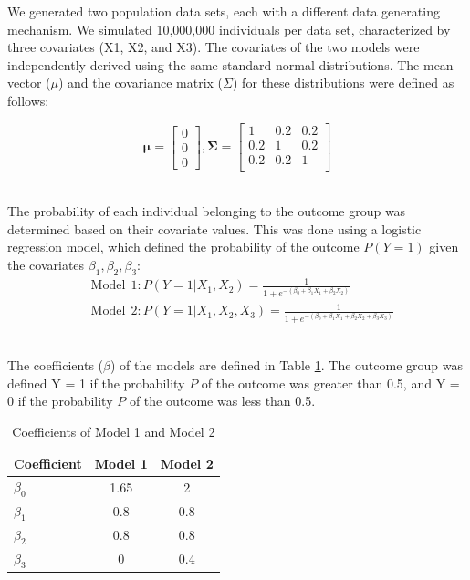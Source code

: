 \documentclass[AMA,STIX1COL]{WileyNJD-v5}
\begin{document}
We generated two population data sets, each with a different data
generating mechanism. We simulated 10,000,000 individuals per data set,
characterized by three covariates (X1, X2, and X3). The covariates of
the two models were independently derived using the same standard normal
distributions. The mean vector (\(\mu\)) and the covariance matrix
(\(\Sigma\)) for these distributions were defined as follows:

\begin{equation*}
\pmb{\mu} = \begin{bmatrix}
 0 \\ 0 \\ 0
\end{bmatrix}, \pmb{\Sigma} = \begin{bmatrix}
1   & 0.2 & 0.2 \\
0.2 & 1   & 0.2 \\
0.2 & 0.2 & 1   \\
\end{bmatrix}
\end{equation*}\

\hfill\break
The probability of each individual belonging to the outcome group was
determined based on their covariate values. This was done using a
logistic regression model, which defined the probability of the outcome
\(P(Y = 1)\) given the covariates \(\beta_1, \beta_2, \beta_3\):\\

\begin{align}
&\mathrm{Model \ \  1:} P(Y=1|X_1,X_2) = \frac{1}{1+e^{-(\beta_0+\beta_1X_1+\beta_2X_2)}} \\
&\mathrm{Model \ \  2:} P(Y=1|X_1,X_2,X_3) = \frac{1}{1+e^{-(\beta_0+\beta_1X_1+\beta_2X_2+\beta_3X_3)}}
\end{align}\

\hfill\break
The coefficients (\(\beta\)) of the models are defined in Table
\ref{table:models}. The outcome group was defined Y = 1 if the
probability \(P\) of the outcome was greater than 0.5, and Y = 0 if the
probability \(P\) of the outcome was less than 0.5.

\begin{table}[h]
\centering
\caption{Coefficients of Model 1 and Model 2}
\begin{tabular}{lcc}
\hline
Coefficient & Model 1 & Model 2 \\
\hline
\(\beta_0\) & 1.65 & 2 \\
\(\beta_1\) & 0.8  & 0.8 \\
\(\beta_2\) & 0.8  & 0.8 \\
\(\beta_3\) & 0    & 0.4 \\
\hline
\end{tabular}
\label{table:models}
\end{table}
\end{document}
